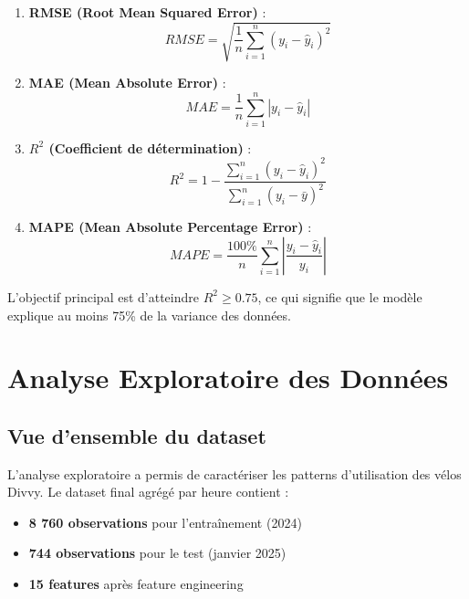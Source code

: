 \documentclass[12pt,a4paper]{article}
\begin{document}
\begin{enumerate}
    \item \textbf{RMSE (Root Mean Squared Error)} :
    \begin{equation}
        RMSE = \sqrt{\frac{1}{n}\sum_{i=1}^{n}(y_i - \hat{y}_i)^2}
    \end{equation}
    
    \item \textbf{MAE (Mean Absolute Error)} :
    \begin{equation}
        MAE = \frac{1}{n}\sum_{i=1}^{n}|y_i - \hat{y}_i|
    \end{equation}
    
    \item \textbf{$R^2$ (Coefficient de détermination)} :
    \begin{equation}
        R^2 = 1 - \frac{\sum_{i=1}^{n}(y_i - \hat{y}_i)^2}{\sum_{i=1}^{n}(y_i - \bar{y})^2}
    \end{equation}
    
    \item \textbf{MAPE (Mean Absolute Percentage Error)} :
    \begin{equation}
        MAPE = \frac{100\%}{n}\sum_{i=1}^{n}\left|\frac{y_i - \hat{y}_i}{y_i}\right|
    \end{equation}
\end{enumerate}

L'objectif principal est d'atteindre $R^2 \geq 0.75$, ce qui signifie que le modèle explique au moins 75\% de la variance des données.

\section{Analyse Exploratoire des Données}

\subsection{Vue d'ensemble du dataset}

L'analyse exploratoire a permis de caractériser les patterns d'utilisation des vélos Divvy. Le dataset final agrégé par heure contient :

\begin{itemize}
    \item \textbf{8 760 observations} pour l'entraînement (2024)
    \item \textbf{744 observations} pour le test (janvier 2025)
    \item \textbf{15 features} après feature engineering
\end{itemize}
\end{document}
